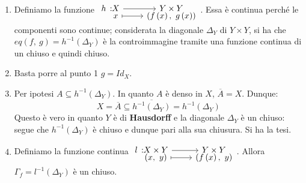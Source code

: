 \begin{demonstration}~{}
\begin{enumerate}[label=\Roman*]
\item Definiamo la funzione $\funztot{h}{X}{Y\times Y}{x}{\left(f\left(x\right),\ g\left(x\right)\right)}$. Essa è continua perché le componenti sono continue; considerata la diagonale $\Delta_{Y}$ di $Y\times Y$, si ha che $eq\left(f,\ g\right)=h^{-1}\left(\Delta_Y\right)$ è la controimmagine tramite una funzione continua di un chiuso e quindi chiuso.
\item Basta porre al punto 1 $g=Id_{X}$.
\item Per ipotesi $A\subseteq h^{-1}\left(\Delta_Y\right)$. In quanto $A$ è denso in $X$, $\overline{A}=X$. Dunque:
\begin{equation*}
X=\overline{A}\subseteq\overline{h^{-1}\left(\Delta_Y\right)}=h^{-1}\left(\Delta_Y\right)
\end{equation*}
Questo è vero in quanto $Y$ è di \textbf{Hausdorff} e la diagonale $\Delta_Y$ è un chiuso: segue che $h^{-1}\left(\Delta_Y\right)$ è chiuso e dunque pari alla sua chiusura. Si ha la tesi.
\item Definiamo la funzione continua $\funztot{l}{X\times Y}{Y\times Y}{\left(x,\ y\right)}{\left(f\left(x\right),\ y\right)}$. Allora $\Gamma_f=l^{-1}\left(\Delta_Y\right)$ è un chiuso.
\end{enumerate}
\end{demonstration}
